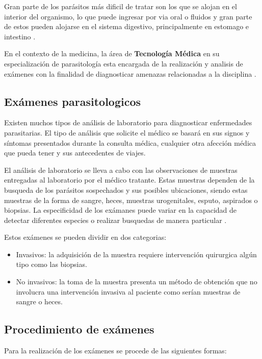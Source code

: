 \documentclass[letter,12pt]{report}
\begin{document}
Gran parte de los parásitos más dificil de tratar son los que se alojan en el
interior del organismo, lo que puede ingresar por via oral o fluidos y gran parte de
estos pueden alojarse en el sistema digestivo, principalmente en estomago e
intestino \cite{Vigil}.

En el contexto de la medicina, la área de \textbf{Tecnología Médica} en su
especialización de parasitología esta encargada de la realización y analisis de
exámenes con la finalidad de diagnosticar amenazas relacionadas a la
disciplina \cite{Digest}.

\subsection{Exámenes parasitologicos}

Existen muchos tipos de análisis de laboratorio para diagnosticar enfermedades parasitarias.
El tipo de análisis que solicite el médico se basará en sus signos y síntomas presentados
durante la consulta médica, cualquier otra afección médica que pueda tener y sus
antecedentes de viajes.

El análisis de laboratorio se lleva a cabo con las observaciones de muestras entregadas
al laboratorio por el médico tratante. Estas muestras dependen de la busqueda de los
parásitos sospechados y sus posibles ubicaciones, siendo estas muestras de la forma de
sangre, heces, muestras urogenitales, esputo, aspirados o biopsias. La especificidad de
los exámanes puede variar en la capacidad de detectar diferentes especies o realizar
busquedas de manera particular \cite{Util}.

Estos exámenes se pueden dividir en dos categorias:

\begin{itemize}
    \item Invasivos: la adquisición de la muestra requiere intervención
        quirurgica algún tipo como las biopsias.
    \item No invasivos: la toma de la muestra presenta un método de obtención que no
        involucra una intervención invasiva al paciente como serían muestras de sangre o
        heces.
\end{itemize}

\subsection{Procedimiento de exámenes}

Para la realización de los exámenes se procede de las siguientes formas: \cite{Diagnost}
\end{document}
